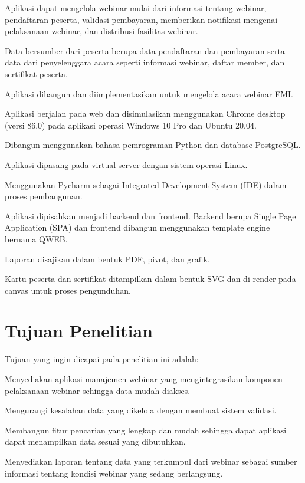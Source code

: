 \begin{ol}
  \item Aplikasi dapat mengelola webinar mulai dari informasi tentang webinar, pendaftaran peserta, validasi pembayaran, memberikan notifikasi mengenai pelaksanaan webinar, dan distribusi fasilitas webinar.
  \item Data bersumber dari peserta berupa data pendaftaran dan pembayaran serta data dari penyelenggara acara seperti informasi webinar, daftar member, dan sertifikat peserta.
  \item Aplikasi dibangun dan diimplementasikan untuk mengelola acara webinar FMI.
  \item Aplikasi berjalan pada web dan disimulasikan menggunakan Chrome desktop (versi 86.0) pada aplikasi operasi Windows 10 Pro dan Ubuntu 20.04.
  \item Dibangun menggunakan bahasa pemrograman Python dan database PostgreSQL.
  \item Aplikasi dipasang pada virtual server dengan sistem operasi Linux.
  \item Menggunakan Pycharm sebagai Integrated Development System (IDE) dalam proses pembangunan.
  \item Aplikasi dipisahkan menjadi backend dan frontend. Backend berupa Single Page Application (SPA) dan frontend dibangun menggunakan template engine bernama QWEB.
  \item Laporan disajikan dalam bentuk PDF, pivot, dan grafik.
  \item Kartu peserta dan sertifikat ditampilkan dalam bentuk SVG dan di render pada canvas untuk proses pengunduhan.
\end{ol}

\section{Tujuan Penelitian}

Tujuan yang ingin dicapai pada penelitian ini adalah:

\begin{ol}
  \item Menyediakan aplikasi manajemen webinar yang mengintegrasikan komponen pelaksanaan webinar sehingga data mudah diakses.
  \item Mengurangi kesalahan data yang dikelola dengan membuat sistem validasi.
  \item Membangun fitur pencarian yang lengkap dan mudah sehingga dapat aplikasi dapat menampilkan data sesuai yang dibutuhkan.
  \item Menyediakan laporan tentang data yang terkumpul dari webinar sebagai sumber informasi tentang kondisi webinar yang sedang berlangsung.
\end{ol}

